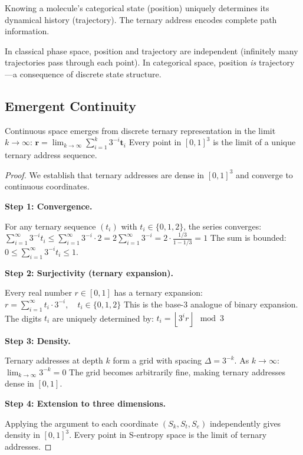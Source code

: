 \begin{corollary}
\label{cor:path}
Knowing a molecule's categorical state (position) uniquely determines its dynamical history (trajectory). The ternary address encodes complete path information.
\end{corollary}

\begin{remark}
In classical phase space, position and trajectory are independent (infinitely many trajectories pass through each point). In categorical space, position \emph{is} trajectory—a consequence of discrete state structure.
\end{remark}

\subsection{Emergent Continuity}

\begin{theorem}
\label{thm:continuity}
Continuous space emerges from discrete ternary representation in the limit $k \to \infty$:
$
\mathbf{r} = \lim_{k \to \infty} \sum_{i=1}^{k} 3^{-i} \mathbf{t}_i
$
Every point in $[0,1]^3$ is the limit of a unique ternary address sequence.
\end{theorem}

\begin{proof}
We establish that ternary addresses are dense in $[0,1]^3$ and converge to continuous coordinates.

\textbf{Step 1: Convergence.}

For any ternary sequence $(t_i)$ with $t_i \in \{0, 1, 2\}$, the series converges:
$
\sum_{i=1}^{\infty} 3^{-i} t_i \leq \sum_{i=1}^{\infty} 3^{-i} \cdot 2 = 2 \sum_{i=1}^{\infty} 3^{-i} = 2 \cdot \frac{1/3}{1-1/3} = 1
$
The sum is bounded: $0 \leq \sum_{i=1}^{\infty} 3^{-i} t_i \leq 1$.

\textbf{Step 2: Surjectivity (ternary expansion).}

Every real number $r \in [0,1]$ has a ternary expansion:
$
r = \sum_{i=1}^{\infty} t_i \cdot 3^{-i}, \quad t_i \in \{0, 1, 2\}
$
This is the base-3 analogue of binary expansion. The digits $t_i$ are uniquely determined by:
$
t_i = \left\lfloor 3^i r \right\rfloor \mod 3
$

\textbf{Step 3: Density.}

Ternary addresses at depth $k$ form a grid with spacing $\Delta = 3^{-k}$. As $k \to \infty$:
$
\lim_{k \to \infty} 3^{-k} = 0
$
The grid becomes arbitrarily fine, making ternary addresses dense in $[0,1]$.

\textbf{Step 4: Extension to three dimensions.}

Applying the argument to each coordinate $(S_k, S_t, S_e)$ independently gives density in $[0,1]^3$. Every point in S-entropy space is the limit of ternary addresses.
\end{proof}

